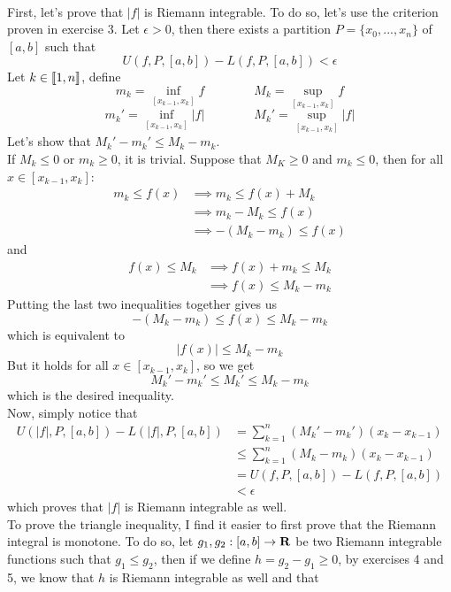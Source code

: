  \begin{solution}
    \\ First, let's prove that $|f|$ is Riemann integrable. To do so, let's use the criterion proven in exercise 3. Let $\epsilon > 0$, then there exists a partition $P = \{x_0, ..., x_n\}$ of $[a,b]$ such that
    $$U(f, P, [a,b]) - L(f, P, [a,b]) < \epsilon$$
    Let $k \in \llbracket 1 , n \rrbracket$, define
    $$m_k = \inf_{[x_{k-1}, x_k]}f \qquad \qquad M_k = \sup_{[x_{k-1}, x_k]}f$$
    $$m_k' = \inf_{[x_{k-1}, x_k]}|f| \qquad \qquad M_k' = \sup_{[x_{k-1}, x_k]}|f|$$
    Let's show that $M_k' - m_k' \leq M_k - m_k$. \\
    If $M_k \leq 0$ or $m_k \geq 0$, it is trivial. Suppose that $M_K \geq 0$ and $m_k \leq 0$, then for all $x \in [x_{k-1}, x_k]$:
    \begin{align*}
            m_k \leq f(x) &\implies m_k \leq f(x) + M_k \\
            &\implies m_k - M_k \leq f(x) \\
            &\implies -(M_k - m_k) \leq f(x)
    \end{align*}
    and 
    \begin{align*}
        f(x) \leq M_k &\implies f(x) + m_k \leq M_k \\
        &\implies f(x) \leq M_k - m_k
    \end{align*}
    Putting the last two inequalities together gives us
    $$-(M_k - m_k) \leq f(x) \leq M_k - m_k$$
    which is equivalent to
    $$|f(x)| \leq M_k - m_k$$
    But it holds for all $x \in [x_{k-1}, x_k]$, so we get
    $$M_k' - m_k' \leq M_k' \leq M_k - m_k$$
    which is the desired inequality. \\
    Now, simply notice that
    \begin{align*}
        U(|f|, P, [a,b]) - L(|f|, P, [a,b]) &= \sum_{k=1}^{n}(M_k' - m_k')(x_k - x_{k-1}) \\
        &\leq \sum_{k=1}^{n}(M_k - m_k)(x_k - x_{k-1}) \\
        &= U(f, P, [a,b]) - L(f, P, [a,b]) \\
        &< \epsilon
    \end{align*}
    which proves that $|f|$ is Riemann integrable as well. \\
    To prove the triangle inequality, I find it easier to first prove that the Riemann integral is monotone. To do so, let $g_1,g_2 : [a,b] \to \mathbf{R}$ be two Riemann integrable functions such that $g_1 \leq g_2$, then if we define $h = g_2 - g_1 \geq 0$, by exercises 4 and 5, we know that $h$ is Riemann integrable as well and that

\end{solution}
